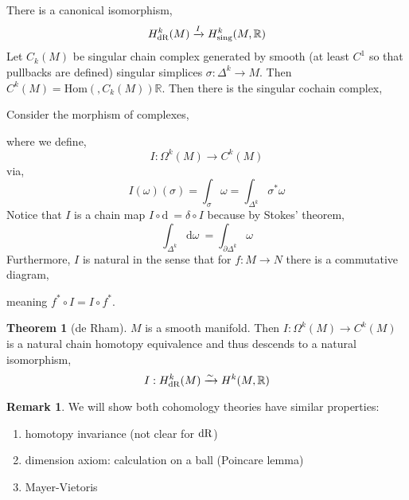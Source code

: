 \documentclass[12pt]{extarticle}
\newcommand{\R}{\mathbb{R}}
\newcommand{\Hom}[2]{\mathrm{Hom}\left( #1, #2 \right)}
\renewcommand{\d}[1]{ \mathrm{d}#1 \:}
\theoremstyle{definition}
\newtheorem{theorem}{Theorem}[section]
\newtheorem{remark}{Remark}
\begin{document}
There is a canonical isomorphism,
\[ H^k_{\dR}(M) \xrightarrow{I} H^k_{\text{sing}}(M, \R) \]
Let $C_k(M)$ be singular chain complex generated by smooth (at least $C^1$ so that pullbacks are defined) singular simplices $\sigma : \Delta^k \to M$. Then $C^k(M) = \Hom{}{C_k(M)}{\R}$. Then there is the singular cochain complex,
\begin{center}
\end{center} 
Consider the morphism of complexes,
\begin{center}
\end{center}
where we define,
\[ I : \Omega^k(M) \to C^k(M) \]
via,
\[ I(\omega)(\sigma) = \int_\sigma \omega = \int_{\Delta^k} \sigma^* \omega \]
Notice that $I$ is a chain map $I \circ \d{} = \delta \circ I$ because by Stokes' theorem,
\[ \int_{\Delta^k} \d{\omega} = \int_{\partial \Delta^k} \omega \]
Furthermore, $I$ is natural in the sense that for $f : M \to N$ there is a commutative diagram,
\begin{center}
\end{center}
meaning $f^* \circ I = I \circ f^*$. 

\begin{theorem}[de Rham]
$M$ is a smooth manifold. Then $I : \Omega^k(M) \to C^k(M)$ is a natural chain homotopy equivalence and thus descends to a natural isomorphism,
\[ I : H^k_{\dR}(M) \xrightarrow{\sim} H^k(M, \R) \]
\end{theorem}

\begin{remark}
We will show both cohomology theories have similar properties:
\begin{enumerate}
\item homotopy invariance (not clear for $\mathrm{dR}$)
\item dimension axiom: calculation on a ball (Poincare lemma)
\item Mayer-Vietoris 
\end{enumerate}
\end{remark}
\end{document}

